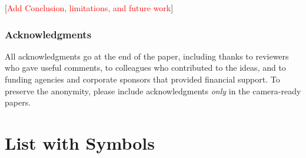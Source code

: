\documentclass[twoside]{article}
\newcommand{\todo}[1]{[\textcolor{red}{#1}]}
\begin{document}
\todo{Add Conclusion, limitations, and future work}

\subsubsection*{Acknowledgments}
All acknowledgments go at the end of the paper, including thanks to reviewers who gave useful comments, to colleagues who contributed to the ideas, and to funding agencies and corporate sponsors that provided financial support. 
To preserve the anonymity, please include acknowledgments \emph{only} in the camera-ready papers.



\appendix

\section{List with Symbols}
\label{sec:list-with-symbols}
\end{document}
